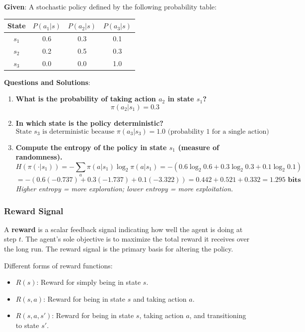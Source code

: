 \documentclass[11pt,a4paper]{article}
\begin{document}
\begin{tcolorbox}[colback=blue!5!white,colframe=blue!75!black,title=\textbf{Worked Example: Computing Action Probabilities}]
\textbf{Given}: A stochastic policy defined by the following probability table:

\begin{center}
\begin{tabular}{|c|c|c|c|}
\hline
State & $P(a_1|s)$ & $P(a_2|s)$ & $P(a_3|s)$ \\ \hline
$s_1$ & 0.6 & 0.3 & 0.1 \\ \hline
$s_2$ & 0.2 & 0.5 & 0.3 \\ \hline
$s_3$ & 0.0 & 0.0 & 1.0 \\ \hline
\end{tabular}
\end{center}

\textbf{Questions and Solutions}:
\begin{enumerate}
    \item \textbf{What is the probability of taking action $a_2$ in state $s_1$?}
    \[
    \pi(a_2|s_1) = 0.3
    \]
    
    \item \textbf{In which state is the policy deterministic?}
    \[
    \text{State } s_3 \text{ is deterministic because } \pi(a_3|s_3) = 1.0 \text{ (probability 1 for a single action)}
    \]
    
    \item \textbf{Compute the entropy of the policy in state $s_1$ (measure of randomness).}
    \[
    H(\pi(\cdot|s_1)) = -\sum_a \pi(a|s_1) \log_2 \pi(a|s_1) = -(0.6 \log_2 0.6 + 0.3 \log_2 0.3 + 0.1 \log_2 0.1)
    \]
    \[
    = -(0.6(-0.737) + 0.3(-1.737) + 0.1(-3.322)) = 0.442 + 0.521 + 0.332 = \mathbf{1.295 \text{ bits}}
    \]
    \textit{Higher entropy = more exploration; lower entropy = more exploitation.}
\end{enumerate}
\end{tcolorbox}

\subsubsection{Reward Signal}

A \textbf{reward} is a scalar feedback signal indicating how well the agent is doing at step $t$. The agent's sole objective is to maximize the total reward it receives over the long run. The reward signal is the primary basis for altering the policy.

Different forms of reward functions:
\begin{itemize}
    \item $R(s)$: Reward for simply being in state $s$.
    \item $R(s, a)$: Reward for being in state $s$ and taking action $a$.
    \item $R(s, a, s')$: Reward for being in state $s$, taking action $a$, and transitioning to state $s'$.
\end{itemize}
\end{document}
